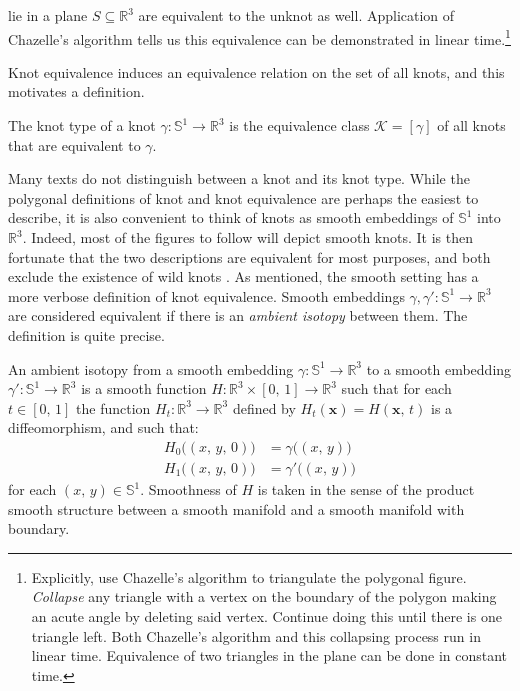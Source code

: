     lie in a plane $S\subseteq\mathbb{R}^{3}$ are equivalent to the unknot as
    well. Application of Chazelle's algorithm
    \cite{ChazelleTriangulationAlgorithm} tells us this equivalence
    can be demonstrated in linear time.\footnote{%
        Explicitly, use Chazelle's algorithm to triangulate the polygonal
        figure. \textit{Collapse} any triangle with a vertex on the boundary
        of the polygon making an acute angle by deleting said vertex.
        Continue doing this until there is one triangle left.
        Both Chazelle's algorithm and this collapsing
        process run in linear time. Equivalence of two triangles in the
        plane can be done in constant time.
    }
    \par\hfill\par
    Knot equivalence induces an equivalence relation on the set of all knots,
    and this motivates a definition.
    \begin{definition}
        The knot type of a knot $\gamma:\mathbb{S}^{1}\rightarrow\mathbb{R}^{3}$
        is the equivalence class $\mathcal{K}=[\gamma]$ of all knots that are
        equivalent to $\gamma$.
    \end{definition}
    Many texts do not distinguish between a knot and its knot type.
    While the polygonal definitions of knot and knot equivalence are perhaps
    the easiest to describe, it is also convenient to think of knots as smooth
    embeddings of $\mathbb{S}^{1}$ into $\mathbb{R}^{3}$. Indeed, most of the
    figures to follow will depict smooth knots. It is then fortunate that the
    two descriptions are equivalent for most purposes, and both exclude the
    existence of wild knots \cite[p.~147]{CrowellFoxKnotTheory}. As mentioned,
    the smooth setting has a more verbose definition of knot equivalence.
    Smooth embeddings $\gamma,\gamma':\mathbb{S}^{1}\rightarrow\mathbb{R}^{3}$
    are considered equivalent if there is an \textit{ambient isotopy}
    between them. The definition is quite precise.
    \newpage
    \begin{definition}
        An ambient isotopy from a smooth embedding
        $\gamma:\mathbb{S}^{1}\rightarrow\mathbb{R}^{3}$ to a smooth
        embedding $\gamma':\mathbb{S}^{1}\rightarrow\mathbb{R}^{3}$ is a
        smooth function
        $H:\mathbb{R}^{3}\times[0,\,1]\rightarrow\mathbb{R}^{3}$
        such that for each $t\in[0,\,1]$ the function
        $H_{t}:\mathbb{R}^{3}\rightarrow\mathbb{R}^{3}$ defined by
        $H_{t}(\mathbf{x})=H(\mathbf{x},\,t)$ is a diffeomorphism,
        and such that:
        \begin{subequations}
            \begin{align}
                H_{0}\big((x,\,y,\,0)\big)&=\gamma\big((x,\,y)\big)\\
                H_{1}\big((x,\,y,\,0)\big)&=\gamma'\big((x,\,y)\big)
            \end{align}
        \end{subequations}
        for each $(x,\,y)\in\mathbb{S}^{1}$. Smoothness of $H$ is taken in
        the sense of the product smooth structure between a smooth manifold and
        a smooth manifold with boundary.
    \end{definition}
